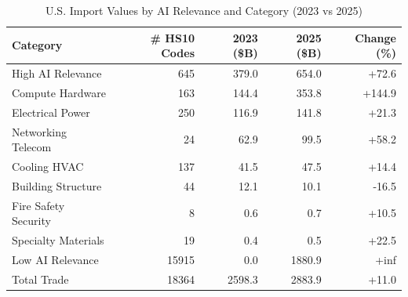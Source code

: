 \begin{table}[htbp]
\centering
\caption{U.S. Import Values by AI Relevance and Category (2023 vs 2025)}
\label{tab:trade_hierarchical}
\setlength{\tabcolsep}{4.5mm}
\renewcommand{\arraystretch}{1.60}
\begin{tabular}{lrrrr}
\toprule
Category & \# HS10 Codes & 2023 (\$B) & 2025 (\$B) & Change (\%) \\
\midrule
High AI Relevance & 645 & 379.0 & 654.0 & +72.6 \\
\quad\quad Compute Hardware & 163 & 144.4 & 353.8 & +144.9 \\
\quad\quad Electrical Power & 250 & 116.9 & 141.8 & +21.3 \\
\quad\quad Networking Telecom & 24 & 62.9 & 99.5 & +58.2 \\
\quad\quad Cooling HVAC & 137 & 41.5 & 47.5 & +14.4 \\
\quad\quad Building Structure & 44 & 12.1 & 10.1 & -16.5 \\
\quad\quad Fire Safety Security & 8 & 0.6 & 0.7 & +10.5 \\
\quad\quad Specialty Materials & 19 & 0.4 & 0.5 & +22.5 \\
Low AI Relevance & 15915 & 0.0 & 1880.9 & +inf \\
\midrule
Total Trade & 18364 & 2598.3 & 2883.9 & +11.0 \\
\bottomrule
\end{tabular}
\end{table}
